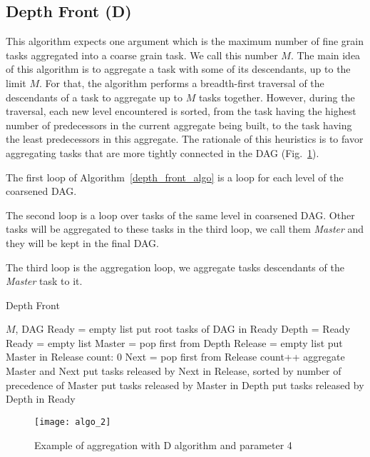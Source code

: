 \subsection{Depth Front (D)}
This algorithm expects one argument which is the maximum number of
fine grain tasks aggregated into a coarse grain task. We call this
number $M$.
The main idea of this algorithm is to aggregate a task with some
of its descendants, up to the limit $M$. For that, the algorithm
performs a breadth-first traversal of the descendants of a task to
aggregate up to $M$ tasks together. However, during the traversal, each new
level encountered is sorted, from the task having the highest
number of predecessors in the current aggregate being built, to
the task having the least predecessors in this aggregate. The
rationale of this heuristics is to favor aggregating tasks that
are more tightly connected in the DAG (Fig.~\ref{fig:D_algo}).


The first loop of Algorithm~\ref{depth_front_algo} is a loop for each
level of the coarsened DAG.

The second loop is a loop over tasks of the same level in coarsened DAG.
Other tasks will be aggregated to these tasks in the third loop, we call them
{\em Master} and they will be kept in the final DAG.

The third loop is the aggregation loop, we aggregate tasks descendants of
the {\em Master} task to it.

\begin{algorithm}
  \caption{Depth Front}
  \label{depth_front_algo}
  \begin{algorithmic}
    \REQUIRE $M$, DAG
    \STATE Ready = empty list
    \STATE put root tasks of DAG in Ready
    \STATE Depth = Ready
    \STATE Ready = empty list
    \STATE Master = pop first from Depth
    \STATE Release = empty list
    \STATE put Master in Release
    \STATE count: 0
    \STATE Next = pop first from Release
    \STATE count++
    \STATE aggregate Master and Next
    \STATE put tasks released by Next in Release, sorted by
    \STATE \quad number of precedence of Master
    \ENDWHILE
    \STATE put tasks released by Master in Depth
    \ENDWHILE
    \STATE put tasks released by Depth in Ready
    \ENDWHILE
  \end{algorithmic}
\end{algorithm}

\begin{figure}[!ht]
  \centering
  \texttt{[image: algo\_2]}
  \caption{Example of aggregation with D algorithm and parameter 4}
  \label{fig:D_algo}
\end{figure}

